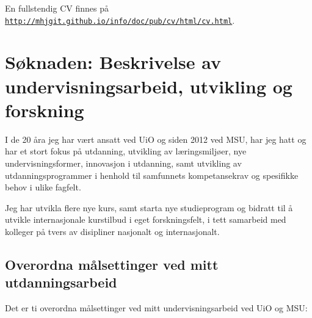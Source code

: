 \documentclass[aps,floatfix,preprint]{revtex4-1}
\begin{document}
En fullstendig CV finnes på
\href{{http://mhjgit.github.io/info/doc/pub/cv/html/cv.html}}{\nolinkurl{http://mhjgit.github.io/info/doc/pub/cv/html/cv.html}}.





\section*{Søknaden: Beskrivelse av undervisningsarbeid, utvikling og forskning}

I de 20 åra jeg har vært ansatt ved UiO og siden 2012 ved MSU,
har jeg hatt og har et stort fokus på utdanning, utvikling
av læringsmiljøer, nye undervisningsformer, innovasjon i utdanning,
samt utvikling av utdanningsprogrammer i henhold til samfunnets
kompetansekrav og spesifikke behov i ulike fagfelt.

Jeg har utvikla flere nye kurs, samt starta nye studieprogram og
bidratt til å utvikle internasjonale kurstilbud i eget forskningsfelt,
i tett samarbeid med kolleger på tvers av disipliner nasjonalt og
internasjonalt.


\subsection*{Overordna målsettinger ved mitt utdanningsarbeid}

Det er ti overordna målsettinger ved mitt undervisningsarbeid ved UiO og MSU:
\end{document}
